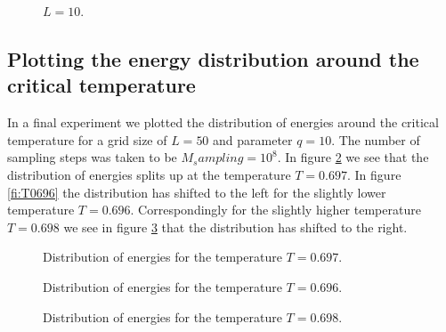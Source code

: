 \begin{figure}
\centering
\begin{minipage}{0.7\textwidth}
\centering
\graphicspath{{../../Plots/}}

\caption{$L=10$.}
\label{fi:energies_T_q_L10}
\end{minipage}
\end{figure}


\subsection{Plotting the energy distribution around the critical temperature}

In a final experiment we plotted the distribution of energies around the critical temperature for a grid size of $L=50$ and parameter $q=10$. The number of sampling steps was taken to be $M_sampling=10^8$. In figure \ref{fi:T0697} we see that the distribution of energies splits up at the temperature $T=0.697$. In figure \ref{fi:T0696} the distribution has shifted to the left for the slightly lower temperature $T=0.696$. 
Correspondingly for the slightly higher temperature $T=0.698$ we see in figure \ref{fi:T0698} that the distribution has shifted to the right.

\begin{figure}
\centering
\begin{minipage}{0.7\textwidth}
\centering
\graphicspath{{../../Plots/}}

\caption{Distribution of energies for the temperature $T=0.697$.}
\label{fi:T0697}
\end{minipage}
\end{figure}

\begin{figure}
\centering
\begin{minipage}[b]{0.45\textwidth}
\centering
\graphicspath{{../../Plots/}}

\caption{Distribution of energies for the temperature  $T=0.696$.}
\label{fi:T0696}
\end{minipage}
\hfill
\begin{minipage}[b]{0.45\textwidth}
\centering
\graphicspath{{../../Plots/}}

\caption{Distribution of energies for the temperature  $T=0.698$.}
\label{fi:T0698}
\end{minipage}
\end{figure}



